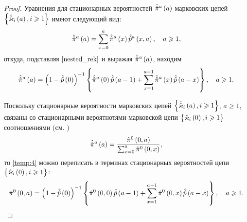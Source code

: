 \documentclass[a4paper,14pt,russian]{article}
\newcommand{\Markkhato}[0]{\brrr{ \hat{\vk}_i\br{0}, i \geqslant 1}}
\newcommand{\Markkhatoa}[0]{\brrr{ \hat{\hat{\vk}}_i\br{a}, i \geqslant 1}}
\newcommand{\p}{\hat{p}}
\begin{document}
\begin{proof}
Уравнения для стационарных вероятностей $\hat{\hat{\pi}}^a\left(a\right)$ марковских цепей $\Markkhatoa$ имеют следующий вид:
\begin{equation*}
 \hat{\hat{\pi}}^a\br{a} = \sum_{x=0}^a \hat{\hat{\pi}}^a \br{x} \hat{\p}^a\br{x,a}, \quad a \geqslant 1,
\end{equation*}
откуда, подставляя $\eqref{nested_rek}$ и выражая $\hat{\hat{\pi}}^a\left(a\right)$, находим
\begin{equation}
 \hat{\hat{\pi}}^a\br{a} = \br{1 - \hat{\p}\br{0}}^{-1}\brrr{\hat{\hat{\pi}}^a\br{0}\hat{\p}\br{a-1} +
 \sum_{x=1}^{a-1}\hat{\hat{\pi}}^a\br{x}\hat{\p}\br{a-x}}, \quad a \geqslant 1.
 \label{temp:4}
\end{equation}

Поскольку стационарные вероятности марковских цепей $\Markkhatoa$, $a \geqslant 1$, связаны со стационарными 
вероятнотями марковской цепи $\Markkhato$ соотношениями (см. \cite[с. 142]{Kemeny})
\begin{equation*}
 \hat{\hat{\pi}}^a \left(a\right) = \frac{\hat{\pi}^0 \left(0,a\right)}{\sum_{x=0}^{a}\hat{\pi}^0 \left(0, x\right)},
\end{equation*}
то \eqref{temp:4} можно переписать в терминах стационарных вероятностей цепи $\Markkhato$:
\begin{equation}
\hat{\pi}^0 \br{0,a} = \br{1 - \hat{\p}\br{0}}^{-1}\brrr{\hat{\pi}^0 \br{0,0}\hat{\p}\br{a-1} +
 \sum_{x=1}^{a-1}\hat{\pi}^0 \br{0,x}\hat{\p}\br{a-x}}, \quad a \geqslant 1.
 \label{temp:5}
\end{equation}


\end{proof}
\end{document}
